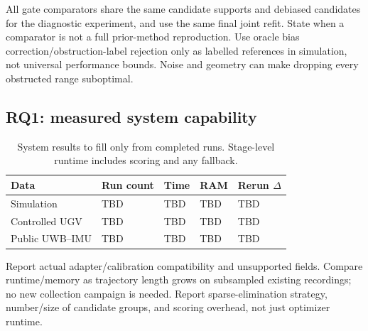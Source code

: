 \documentclass[conference]{IEEEtran}
\begin{document}
All gate comparators share the same candidate supports and debiased candidates for the diagnostic experiment, and use the same final joint refit. State when a comparator is not a full prior-method reproduction. Use oracle bias correction/obstruction-label rejection only as labelled references in simulation, not universal performance bounds. Noise and geometry can make dropping every obstructed range suboptimal.

\subsection{RQ1: measured system capability}
\begin{table}[t]
\centering\small
\caption{System results to fill only from completed runs. Stage-level runtime includes scoring and any fallback.}
\label{tab:system_results}
\begin{tabularx}{\columnwidth}{@{}lXXXX@{}}
\toprule
Data & Run count & Time & RAM & Rerun $\Delta$\\
\midrule
Simulation & TBD & TBD & TBD & TBD\\
Controlled UGV & TBD & TBD & TBD & TBD\\
Public UWB--IMU & TBD & TBD & TBD & TBD\\
\bottomrule
\end{tabularx}
\end{table}
Report actual adapter/calibration compatibility and unsupported fields. Compare runtime/memory as trajectory length grows on subsampled existing recordings; no new collection campaign is needed. Report sparse-elimination strategy, number/size of candidate groups, and scoring overhead, not just optimizer runtime.
\end{document}
